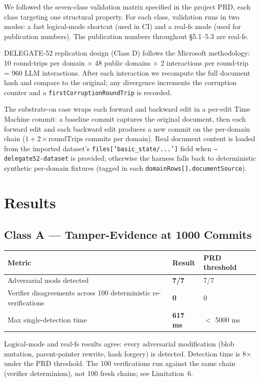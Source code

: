 \documentclass[11pt]{article}
\begin{document}
We followed the seven-class validation matrix specified in the project PRD, each class targeting one structural property. For each class, validation runs in two modes: a fast logical-mode shortcut (used in CI) and a real-fs mode (used for publication numbers). The publication numbers throughout \S5.1--5.3 are real-fs.

DELEGATE-52 replication design (Class D) follows the Microsoft methodology: 10 round-trips per domain $\times$ 48 public domains $\times$ 2 interactions per round-trip = 960 LLM interactions. After each interaction we recompute the full document hash and compare to the original; any divergence increments the corruption counter and a \texttt{firstCorruptionRoundTrip} is recorded.

The substrate-on case wraps each forward and backward edit in a per-edit Time Machine commit: a baseline commit captures the original document, then each forward edit and each backward edit produces a new commit on the per-domain chain ($1 + 2 \times \text{roundTrips}$ commits per domain). Real document content is loaded from the imported dataset's \texttt{files['basic\_state/...']} field when \texttt{--delegate52-dataset} is provided; otherwise the harness falls back to deterministic synthetic per-domain fixtures (tagged in each \texttt{domainRows[].documentSource}).

\section{Results}

\subsection{Class A --- Tamper-Evidence at 1000 Commits}

\begin{tabular}{lll}
\toprule
Metric & Result & PRD threshold \\
\midrule
Adversarial mods detected & \textbf{7/7} & 7/7 \\
Verifier disagreements across 100 deterministic re-verifications & \textbf{0} & 0 \\
Max single-detection time & \textbf{617 ms} & $<$ 5000 ms \\
\bottomrule
\end{tabular}

Logical-mode and real-fs results agree: every adversarial modification (blob mutation, parent-pointer rewrite, hash forgery) is detected. Detection time is 8$\times$ under the PRD threshold. The 100 verifications run against the same chain (verifier determinism), not 100 fresh chains; see Limitation~6.
\end{document}
